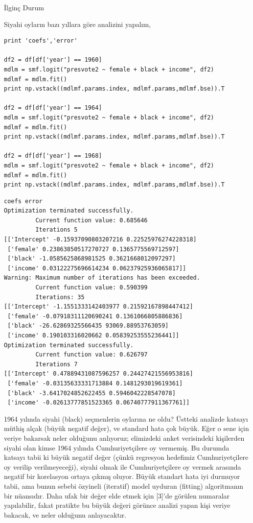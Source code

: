 \documentclass[12pt,fleqn]{article}\usepackage{../../common}
\begin{document}
İlginç Durum

Siyahi oyların bazı yıllara göre analizini yapalım,

\begin{verbatim}
print 'coefs','error'

df2 = df[df['year'] == 1960]
mdlm = smf.logit("presvote2 ~ female + black + income", df2)
mdlmf = mdlm.fit()
print np.vstack((mdlmf.params.index, mdlmf.params,mdlmf.bse)).T

df2 = df[df['year'] == 1964]
mdlm = smf.logit("presvote2 ~ female + black + income", df2)
mdlmf = mdlm.fit()
print np.vstack((mdlmf.params.index, mdlmf.params,mdlmf.bse)).T

df2 = df[df['year'] == 1968]
mdlm = smf.logit("presvote2 ~ female + black + income", df2)
mdlmf = mdlm.fit()
print np.vstack((mdlmf.params.index, mdlmf.params,mdlmf.bse)).T
\end{verbatim}

\begin{verbatim}
coefs error
Optimization terminated successfully.
         Current function value: 0.685646
         Iterations 5
[['Intercept' -0.15937090803207216 0.22525976274228318]
 ['female' 0.23863850517270727 0.1365775569712597]
 ['black' -1.0585625868981525 0.3621668012097297]
 ['income' 0.03122275696614234 0.06237925936065817]]
Warning: Maximum number of iterations has been exceeded.
         Current function value: 0.590399
         Iterations: 35
[['Intercept' -1.1551333142403977 0.21592167898447412]
 ['female' -0.07918311120690241 0.1361066805886836]
 ['black' -26.62869325566435 93069.88953763059]
 ['income' 0.190103316020662 0.05839253555236441]]
Optimization terminated successfully.
         Current function value: 0.626797
         Iterations 7
[['Intercept' 0.47889431087596257 0.24427421556953816]
 ['female' -0.03135633331713884 0.1481293019619361]
 ['black' -3.6417024852622455 0.5946042228547078]
 ['income' -0.02613777851523365 0.06740777911367761]]
\end{verbatim}

1964 yılında siyahi (black) seçmenlerin oylarına ne oldu? Üstteki analizde
katsayı müthiş alçak (büyük negatif değer), ve standard hata çok büyük. Eğer o
sene için veriye bakarsak neler olduğunu anlıyoruz; elimizdeki anket verisindeki
kişilerden siyahi olan kimse 1964 yılında Cumhuriyetçilere oy vermemiş. Bu
durumda katsayı tabii ki büyük negatif değer (çünkü regresyon hedefimiz
Cumhuriyetçilere oy verilip verilmeyeceği), siyahi olmak ile Cumhuriyetçilere oy
vermek arasında negatif bir korelasyon ortaya çıkmış oluyor. Büyük standart hata
iyi durmuyor tabii, ama bunun sebebi özyineli (iteratif) model uyduran (fitting)
algoritmanın bir nüansıdır. Daha ufak bir değer elde etmek için [3]'de görülen
numaralar yapılabilir, fakat pratikte bu büyük değeri görünce analizi yapan kişi
veriye bakacak, ve neler olduğunu anlayacaktır.
\end{document}
